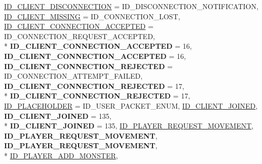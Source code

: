 \begin{DoxyCompactItemize}
\hyperlink{namespace_champ_net_plugin_a2ade5cfa7cf6c25ab7236c6b54a57821a2ed0fbbbbe782bca6c76277c89050ad9}{I\-D\-\_\-\-C\-L\-I\-E\-N\-T\-\_\-\-D\-I\-S\-C\-O\-N\-N\-E\-C\-T\-I\-O\-N} = I\-D\-\_\-\-D\-I\-S\-C\-O\-N\-N\-E\-C\-T\-I\-O\-N\-\_\-\-N\-O\-T\-I\-F\-I\-C\-A\-T\-I\-O\-N, 
\hyperlink{namespace_champ_net_plugin_a2ade5cfa7cf6c25ab7236c6b54a57821a31932f93b241ffddf903d32af0fc2155}{I\-D\-\_\-\-C\-L\-I\-E\-N\-T\-\_\-\-M\-I\-S\-S\-I\-N\-G} = I\-D\-\_\-\-C\-O\-N\-N\-E\-C\-T\-I\-O\-N\-\_\-\-L\-O\-S\-T, 
\hyperlink{namespace_champ_net_plugin_a2ade5cfa7cf6c25ab7236c6b54a57821a0295101371b4a70a1c007a4f6e206e1d}{I\-D\-\_\-\-C\-L\-I\-E\-N\-T\-\_\-\-C\-O\-N\-N\-E\-C\-T\-I\-O\-N\-\_\-\-A\-C\-C\-E\-P\-T\-E\-D} = I\-D\-\_\-\-C\-O\-N\-N\-E\-C\-T\-I\-O\-N\-\_\-\-R\-E\-Q\-U\-E\-S\-T\-\_\-\-A\-C\-C\-E\-P\-T\-E\-D, 
\\*
{\bfseries I\-D\-\_\-\-C\-L\-I\-E\-N\-T\-\_\-\-C\-O\-N\-N\-E\-C\-T\-I\-O\-N\-\_\-\-A\-C\-C\-E\-P\-T\-E\-D} = 16, 
{\bfseries I\-D\-\_\-\-C\-L\-I\-E\-N\-T\-\_\-\-C\-O\-N\-N\-E\-C\-T\-I\-O\-N\-\_\-\-A\-C\-C\-E\-P\-T\-E\-D} = 16, 
{\bfseries I\-D\-\_\-\-C\-L\-I\-E\-N\-T\-\_\-\-C\-O\-N\-N\-E\-C\-T\-I\-O\-N\-\_\-\-R\-E\-J\-E\-C\-T\-E\-D} = I\-D\-\_\-\-C\-O\-N\-N\-E\-C\-T\-I\-O\-N\-\_\-\-A\-T\-T\-E\-M\-P\-T\-\_\-\-F\-A\-I\-L\-E\-D, 
{\bfseries I\-D\-\_\-\-C\-L\-I\-E\-N\-T\-\_\-\-C\-O\-N\-N\-E\-C\-T\-I\-O\-N\-\_\-\-R\-E\-J\-E\-C\-T\-E\-D} = 17, 
\\*
{\bfseries I\-D\-\_\-\-C\-L\-I\-E\-N\-T\-\_\-\-C\-O\-N\-N\-E\-C\-T\-I\-O\-N\-\_\-\-R\-E\-J\-E\-C\-T\-E\-D} = 17, 
\hyperlink{namespace_champ_net_plugin_a2ade5cfa7cf6c25ab7236c6b54a57821a6acf78ef40fd50b2e823237ea828fc1b}{I\-D\-\_\-\-P\-L\-A\-C\-E\-H\-O\-L\-D\-E\-R} = I\-D\-\_\-\-U\-S\-E\-R\-\_\-\-P\-A\-C\-K\-E\-T\-\_\-\-E\-N\-U\-M, 
\hyperlink{namespace_champ_net_plugin_a2ade5cfa7cf6c25ab7236c6b54a57821aeb7ac0bb4cb955cc0b7a3bebc9f14774}{I\-D\-\_\-\-C\-L\-I\-E\-N\-T\-\_\-\-J\-O\-I\-N\-E\-D}, 
{\bfseries I\-D\-\_\-\-C\-L\-I\-E\-N\-T\-\_\-\-J\-O\-I\-N\-E\-D} = 135, 
\\*
{\bfseries I\-D\-\_\-\-C\-L\-I\-E\-N\-T\-\_\-\-J\-O\-I\-N\-E\-D} = 135, 
\hyperlink{namespace_champ_net_plugin_a2ade5cfa7cf6c25ab7236c6b54a57821abaa5b813ea0118cdccbb8f80d461fea8}{I\-D\-\_\-\-P\-L\-A\-Y\-E\-R\-\_\-\-R\-E\-Q\-U\-E\-S\-T\-\_\-\-M\-O\-V\-E\-M\-E\-N\-T}, 
{\bfseries I\-D\-\_\-\-P\-L\-A\-Y\-E\-R\-\_\-\-R\-E\-Q\-U\-E\-S\-T\-\_\-\-M\-O\-V\-E\-M\-E\-N\-T}, 
{\bfseries I\-D\-\_\-\-P\-L\-A\-Y\-E\-R\-\_\-\-R\-E\-Q\-U\-E\-S\-T\-\_\-\-M\-O\-V\-E\-M\-E\-N\-T}, 
\\*
\hyperlink{namespace_champ_net_plugin_a2ade5cfa7cf6c25ab7236c6b54a57821a942496ffc9e2a24c46c0bfd3f24460f6}{I\-D\-\_\-\-P\-L\-A\-Y\-E\-R\-\_\-\-A\-D\-D\-\_\-\-M\-O\-N\-S\-T\-E\-R}, 

\end{DoxyCompactItemize}
